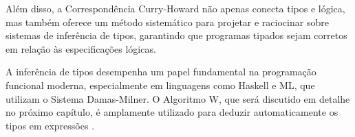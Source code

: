 Além disso, a Correspondência Curry-Howard não apenas conecta tipos e lógica, mas também oferece um método sistemático para projetar e raciocinar sobre sistemas de inferência de tipos, garantindo que programas tipados sejam corretos em relação às especificações lógicas.

A inferência de tipos desempenha um papel fundamental na programação funcional moderna, especialmente em linguagens como Haskell e ML, que utilizam o Sistema Damas-Milner.
O Algoritmo W, que será discutido em detalhe no próximo capítulo, é amplamente utilizado para deduzir automaticamente os tipos em expressões \cite{PIERCE2002}.
